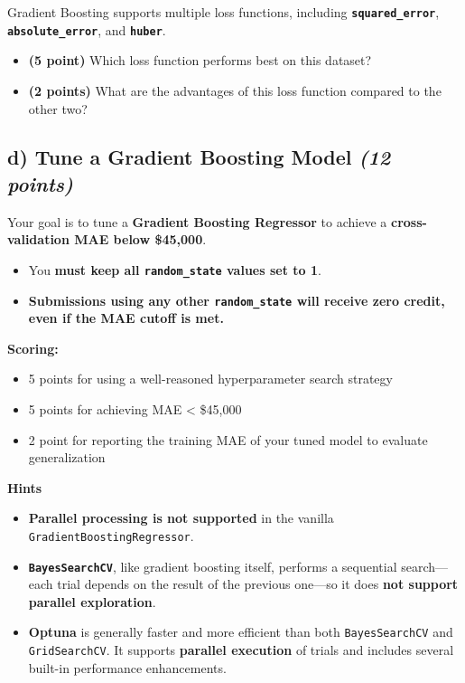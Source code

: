 \documentclass[
  letterpaper,
  DIV=11,
  numbers=noendperiod]{scrreprt}
\providecommand{\tightlist}{%
  \setlength{\itemsep}{0pt}\setlength{\parskip}{0pt}}\usepackage{longtable,booktabs,array}
\begin{document}
Gradient Boosting supports multiple loss functions, including
\textbf{\texttt{squared\_error}}, \textbf{\texttt{absolute\_error}}, and
\textbf{\texttt{huber}}.

\begin{itemize}
\tightlist
\item
  \textbf{(5 point)} Which loss function performs best on this dataset?
\item
  \textbf{(2 points)} What are the advantages of this loss function
  compared to the other two?
\end{itemize}

\subsection{\texorpdfstring{d) Tune a Gradient Boosting Model \emph{(12
points)}}{d) Tune a Gradient Boosting Model (12 points)}}\label{d-tune-a-gradient-boosting-model-12-points}

Your goal is to tune a \textbf{Gradient Boosting Regressor} to achieve a
\textbf{cross-validation MAE below \$45,000}.

\begin{itemize}
\tightlist
\item
  You \textbf{must keep all \texttt{random\_state} values set to 1}.\\
\item
  \textbf{Submissions using any other \texttt{random\_state} will
  receive zero credit, even if the MAE cutoff is met.}
\end{itemize}

\textbf{Scoring:}

\begin{itemize}
\tightlist
\item
  5 points for using a well-reasoned hyperparameter search strategy\\
\item
  5 points for achieving MAE \textless{} \$45,000
\item
  2 point for reporting the training MAE of your tuned model to evaluate
  generalization
\end{itemize}

\textbf{Hints}

\begin{itemize}
\tightlist
\item
  \textbf{Parallel processing is not supported} in the vanilla
  \texttt{GradientBoostingRegressor}.
\item
  \textbf{\texttt{BayesSearchCV}}, like gradient boosting itself,
  performs a sequential search---each trial depends on the result of the
  previous one---so it does \textbf{not support parallel exploration}.
\item
  \textbf{Optuna} is generally faster and more efficient than both
  \texttt{BayesSearchCV} and \texttt{GridSearchCV}. It supports
  \textbf{parallel execution} of trials and includes several built-in
  performance enhancements.
\end{itemize}
\end{document}
